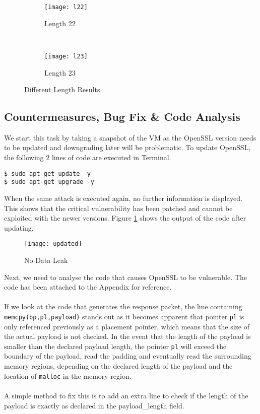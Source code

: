 \documentclass[a4paper,12pt]{article}
\begin{document}
\begin{figure}[H]
    \centering
    \begin{subfigure}[H]{0.49\textwidth}
        \centering
        \texttt{[image: l22]}
        \caption{Length 22}
    \end{subfigure}%
    ~ 
    \begin{subfigure}[H]{0.49\textwidth}
        \centering
        \texttt{[image: l23]}
        \caption{Length 23}
    \end{subfigure}
    \caption{Different Length Results}
\end{figure}
\subsection{Countermeasures, Bug Fix \& Code Analysis}
We start this task by taking a snapshot of the VM as the OpenSSL version needs to be updated and downgrading later will be problematic. To update OpenSSL, the following 2 lines of code are executed in Terminal.
\begin{verbatim}
$ sudo apt-get update -y
$ sudo apt-get upgrade -y
\end{verbatim}
When the same attack is executed again, no further information is displayed. This shows that the critical vulnerability has been patched and cannot be exploited with the newer versions. Figure \ref{fig:updated} shows the output of the code after updating.

\begin{figure}[H]
\centering
\texttt{[image: updated]}
\caption{No Data Leak}
\label{fig:updated}
\end{figure}


\noindent Next, we need to analyse the code that causes OpenSSL to be vulnerable. The code has been attached to the Appendix for reference.\\\\If we look at the code that generates the response packet, the line containing \texttt{memcpy(bp,pl,payload)} stands out as it becomes apparent that pointer \texttt{pl} is only referenced previously as a placement pointer, which means that the size of the actual payload is not checked. In the event that the length of the payload is smaller than the declared payload length, the pointer \texttt{pl} will exceed the boundary of the payload, read the padding and eventually read the surrounding memory regions, depending on the declared length of the payload and the location of \texttt{malloc} in the memory region.\\\\
A simple method to fix this is to add an extra line to check if the length of the payload is exactly as declared in the payload\_length field.
\end{document}
